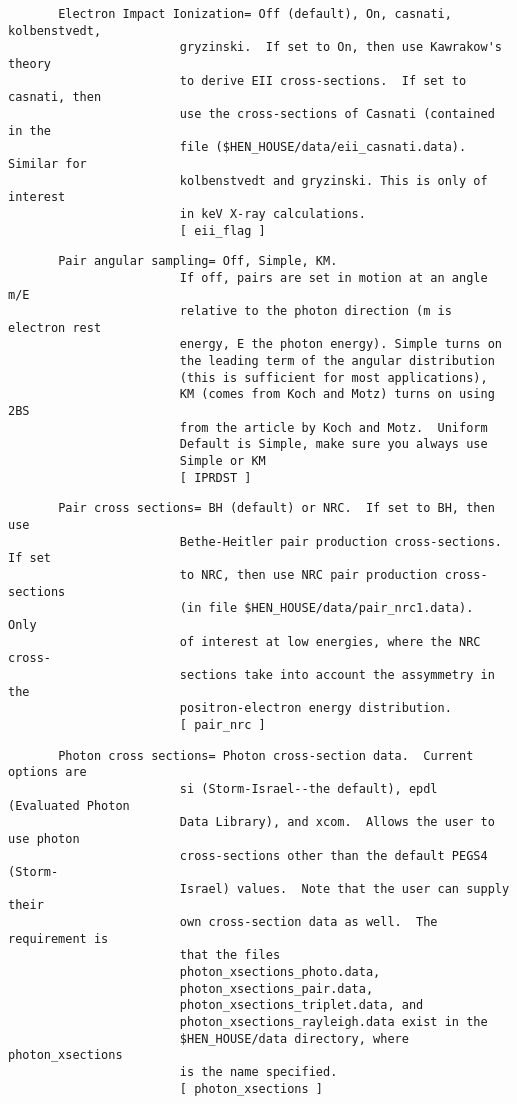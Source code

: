 \begin{verbatim}
       Electron Impact Ionization= Off (default), On, casnati, kolbenstvedt,
                        gryzinski.  If set to On, then use Kawrakow's theory
                        to derive EII cross-sections.  If set to casnati, then
                        use the cross-sections of Casnati (contained in the
                        file ($HEN_HOUSE/data/eii_casnati.data).  Similar for
                        kolbenstvedt and gryzinski. This is only of interest 
                        in keV X-ray calculations.
                        [ eii_flag ]
\end{verbatim}
\begin{verbatim}
       Pair angular sampling= Off, Simple, KM.
                        If off, pairs are set in motion at an angle m/E
                        relative to the photon direction (m is electron rest
                        energy, E the photon energy). Simple turns on
                        the leading term of the angular distribution
                        (this is sufficient for most applications),
                        KM (comes from Koch and Motz) turns on using 2BS
                        from the article by Koch and Motz.  Uniform
                        Default is Simple, make sure you always use 
                        Simple or KM
                        [ IPRDST ]
\end{verbatim}
\begin{verbatim}
       Pair cross sections= BH (default) or NRC.  If set to BH, then use
                        Bethe-Heitler pair production cross-sections.  If set
                        to NRC, then use NRC pair production cross-sections
                        (in file $HEN_HOUSE/data/pair_nrc1.data).  Only
                        of interest at low energies, where the NRC cross-
                        sections take into account the assymmetry in the
                        positron-electron energy distribution. 
                        [ pair_nrc ]
\end{verbatim}
\begin{verbatim}
       Photon cross sections= Photon cross-section data.  Current options are 
                        si (Storm-Israel--the default), epdl (Evaluated Photon
                        Data Library), and xcom.  Allows the user to use photon
                        cross-sections other than the default PEGS4 (Storm-
                        Israel) values.  Note that the user can supply their 
                        own cross-section data as well.  The requirement is 
                        that the files 
                        photon_xsections_photo.data, 
                        photon_xsections_pair.data,
                        photon_xsections_triplet.data, and 
                        photon_xsections_rayleigh.data exist in the
                        $HEN_HOUSE/data directory, where photon_xsections
                        is the name specified.
                        [ photon_xsections ]
\end{verbatim}
